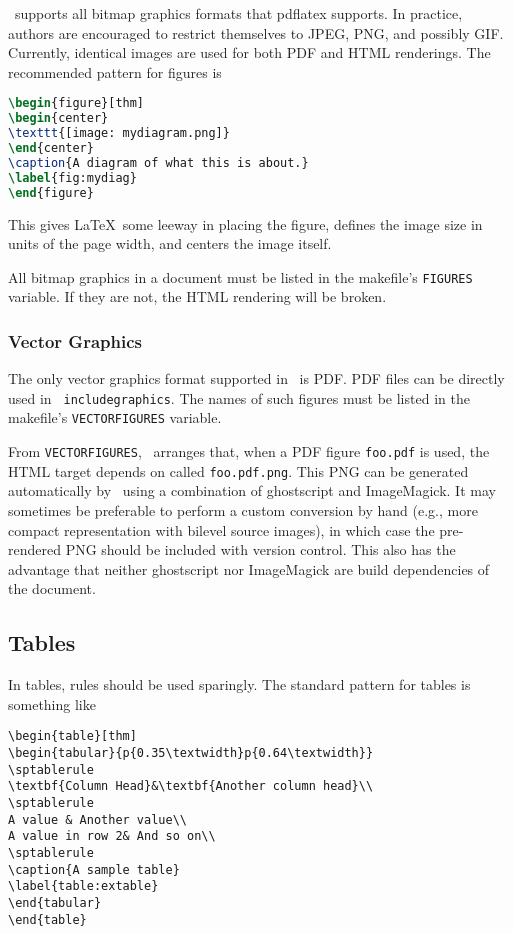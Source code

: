 \documentclass[11pt,a4paper]{ivoa}
\newcommand{\texword}[1]{\texttt{\color{texcolor} #1}}
\begin{document}
\ivoatex\ supports all bitmap graphics formats that pdflatex supports.
In practice, authors are encouraged to restrict themselves to JPEG, PNG,
and possibly GIF.  Currently, identical images are used for both PDF and
HTML renderings.  The recommended pattern for figures is
\begin{lstlisting}[language=tex]
\begin{figure}[thm]
\begin{center}
\texttt{[image: mydiagram.png]}
\end{center}
\caption{A diagram of what this is about.}
\label{fig:mydiag}
\end{figure}
\end{lstlisting}
This gives \LaTeX\ some leeway in placing the figure, defines the image
size in units of the page width, and centers the image itself.

All bitmap graphics in a document must  be listed in the makefile's
\texttt{FIGURES} variable.  If they are not, the HTML rendering will be
broken.

\subsubsection{Vector Graphics}
\label{sect:vectorgraphics}

The only vector graphics format supported in \ivoatex\ is PDF.  PDF
files can be directly used in \texword{includegraphics}.  The names of
such figures must be listed in the makefile's \texttt{VECTORFIGURES}
variable.

From \texttt{VECTORFIGURES}, \ivoatex\ arranges that, when a PDF figure 
\texttt{foo.pdf} is used, the HTML target depends on called
\texttt{foo.pdf.png}.  This PNG can be generated automatically by
\ivoatex\ using a combination of ghostscript and ImageMagick.  It may
sometimes be preferable to perform a custom conversion by hand (e.g.,
more compact representation with bilevel source images), in which case
the pre-rendered PNG should be included with version control.  This also
has the advantage that neither ghostscript nor ImageMagick are build
dependencies of the document.

\subsection{Tables}

In tables, rules should be used sparingly.  The standard pattern for tables is
something like
\begin{lstlisting}
\begin{table}[thm]
\begin{tabular}{p{0.35\textwidth}p{0.64\textwidth}}
\sptablerule
\textbf{Column Head}&\textbf{Another column head}\\
\sptablerule
A value & Another value\\
A value in row 2& And so on\\
\sptablerule
\caption{A sample table}
\label{table:extable}
\end{tabular}
\end{table}
\end{lstlisting}
\end{document}
